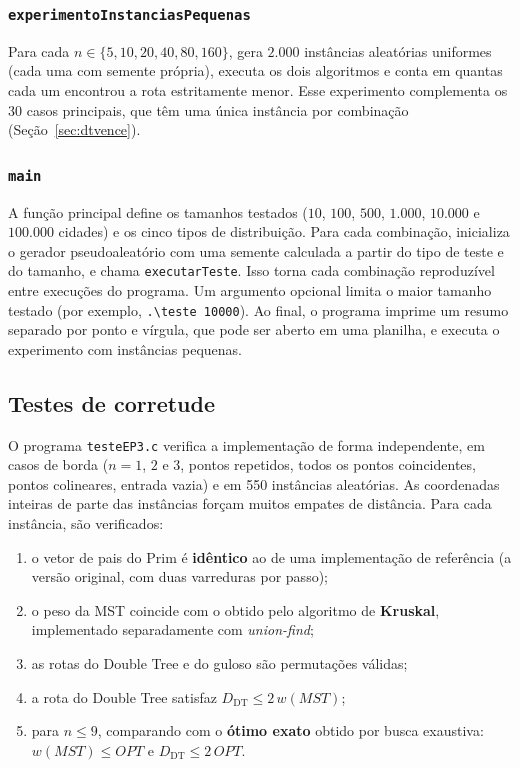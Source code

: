 \documentclass[11pt,a4paper]{article}
\renewcommand{\_}{\underscoreoriginal\allowbreak}
\begin{document}
\subsubsection{\texttt{experimentoInstanciasPequenas}}

Para cada $n\in\{5,10,20,40,80,160\}$, gera $2.000$ instâncias
aleatórias uniformes (cada uma com semente própria), executa os dois
algoritmos e conta em quantas cada um encontrou a rota estritamente
menor. Esse experimento complementa os 30 casos principais, que têm
uma única instância por combinação (Seção~\ref{sec:dtvence}).

\subsubsection{\texttt{main}}

A função principal define os tamanhos testados ($10$, $100$, $500$,
$1.000$, $10.000$ e $100.000$ cidades) e os cinco tipos de distribuição.
Para cada combinação, inicializa o gerador pseudoaleatório com uma
semente calculada a partir do tipo de teste e do tamanho, e chama
\texttt{executarTeste}. Isso torna cada combinação reproduzível entre
execuções do programa. Um argumento opcional limita o maior tamanho
testado (por exemplo, \texttt{.\textbackslash teste 10000}). Ao final,
o programa imprime um resumo separado por ponto e vírgula, que pode ser
aberto em uma planilha, e executa o experimento com instâncias
pequenas.

\subsection{Testes de corretude}
\label{sec:testes}

O programa \texttt{testeEP3.c} verifica a implementação de forma
independente, em casos de borda ($n=1$, $2$ e $3$, pontos repetidos,
todos os pontos coincidentes, pontos colineares, entrada vazia) e em
550 instâncias aleatórias. As coordenadas inteiras de parte das
instâncias forçam muitos empates de distância. Para cada instância, são
verificados:

\begin{enumerate}
  \item o vetor de pais do Prim é \textbf{idêntico} ao de uma
    implementação de referência (a versão original, com duas
    varreduras por passo);
  \item o peso da MST coincide com o obtido pelo algoritmo de
    \textbf{Kruskal}, implementado separadamente com \emph{union-find};
  \item as rotas do Double Tree e do guloso são permutações válidas;
  \item a rota do Double Tree satisfaz $D_{\text{DT}}\leq 2\,w(MST)$;
  \item para $n\leq 9$, comparando com o \textbf{ótimo exato} obtido por
    busca exaustiva: $w(MST)\leq OPT$ e $D_{\text{DT}}\leq 2\,OPT$.
\end{enumerate}
\end{document}
